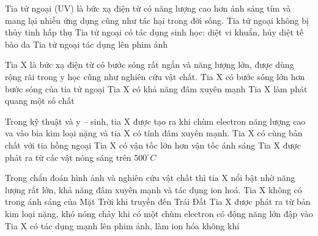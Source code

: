 \setcounter{paragraph}{0}
\setcounter{ex}{0} 
\PhanII
\begin{ex}
Tia tử ngoại (UV) là bức xạ điện từ có năng lượng cao hơn ánh sáng tím và mang lại nhiều ứng dụng cũng như tác hại trong đời sống.
{Tia tử ngoại không bị thủy tinh hấp thụ}
{\True Tia tử ngoại có tác dụng sinh học: diệt vi khuẩn, hủy diệt tế bào da}
{\True Tia tử ngoại tác dụng lên phim ảnh}
\loigiai{
\begin{itemchoice}
\itemch
\itemch
\itemch
\itemch
\end{itemchoice}
}
\end{ex} 
\begin{ex}
Tia X là bức xạ điện từ có bước sóng rất ngắn và năng lượng lớn, được dùng rộng rãi trong y học cũng như nghiên cứu vật chất.
{Tia X có bước sóng lớn hơn bước sóng của tia tử ngoại}
{\True Tia X có khả năng đâm xuyên mạnh}
{\True Tia X làm phát quang một số chất}
\loigiai{
\begin{itemchoice}
\itemch
\itemch
\itemch
\itemch
\end{itemchoice}
}
\end{ex} 
\begin{ex}
Trong kỹ thuật và y – sinh, tia X được tạo ra khi chùm electron năng lượng cao va vào bia kim loại nặng và tia X có tính đâm xuyên mạnh.
{\True Tia X có cùng bản chất với tia hồng ngoại}
{Tia X có vận tốc lớn hơn vận tốc ánh sáng}
{Tia X được phát ra từ các vật nóng sáng trên $500^\circ C$}
\loigiai{
\begin{itemchoice}
\itemch
\itemch
\itemch
\itemch
\end{itemchoice}
}
\end{ex} 
\begin{ex}
Trong chẩn đoán hình ảnh và nghiên cứu vật chất thì tia X nổi bật nhờ năng lượng rất lớn, khả năng đâm xuyên mạnh và tác dụng ion hoá.
{Tia X không có trong ánh sáng của Mặt Trời khi truyền đến Trái Đất}
{\True Tia X được phát ra từ bản kim loại nặng, khó nóng chảy khi có một chùm electron có động năng lớn đập vào}
{\True Tia X có tác dụng mạnh lên phim ảnh, làm ion hóa không khí}
\loigiai{
\begin{itemchoice}
\itemch
\itemch
\itemch
\itemch
\end{itemchoice}
}
\end{ex} 
